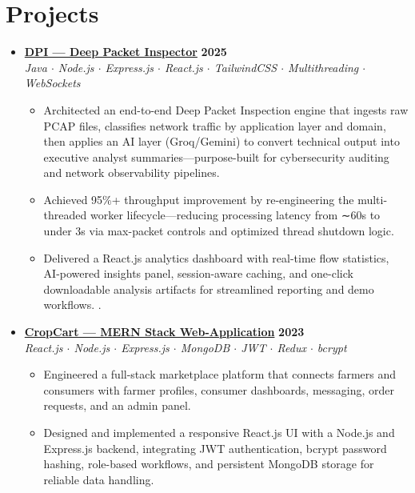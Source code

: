 \documentclass[letterpaper,10pt]{article}
\begin{document}
\section*{Projects}
\begin{itemize}

  \item
  \textbf{\href{https://your-dpi-link.com}{DPI --- Deep Packet Inspector}} \hfill \textbf{2025} \\
  \textit{Java $\cdot$ Node.js $\cdot$ Express.js $\cdot$ React.js $\cdot$ TailwindCSS $\cdot$ Multithreading $\cdot$ WebSockets}
  \begin{itemize}
    \item Architected an end-to-end Deep Packet Inspection engine that ingests raw PCAP files, classifies network traffic by application layer and domain, then applies an AI layer (Groq/Gemini) to convert technical output into executive analyst summaries—purpose-built for cybersecurity auditing and network observability pipelines. 
    \item Achieved 95\%+ throughput improvement by re-engineering the multi-threaded worker lifecycle—reducing processing latency from ∼60s to under 3s via max-packet controls and optimized thread shutdown logic. 
    \item Delivered a React.js analytics dashboard with real-time flow statistics, AI-powered insights panel, session-aware caching, and one-click downloadable analysis artifacts for streamlined reporting and demo workflows. .
  \end{itemize}

  \item
  \textbf{\href{https://crop-cart-six.vercel.app/}{CropCart --- MERN Stack Web-Application}} \hfill \textbf{2023} \\
 \textit{React.js $\cdot$ Node.js $\cdot$ Express.js $\cdot$ MongoDB $\cdot$ JWT $\cdot$ Redux $\cdot$ bcrypt}
  \begin{itemize}
    \item Engineered a full-stack marketplace platform that connects farmers and consumers with farmer profiles, consumer dashboards, messaging, order requests, and an admin panel.
  \item Designed and implemented a responsive React.js UI with a Node.js and Express.js backend, integrating JWT authentication, bcrypt password hashing, role-based workflows, and persistent MongoDB storage for reliable data handling.
\end{itemize}
  \end{itemize}
\end{document}

